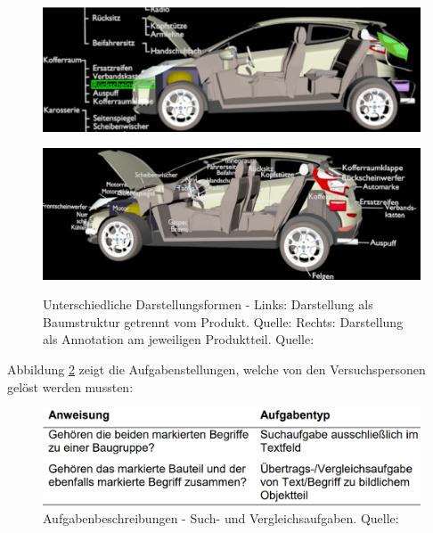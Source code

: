 \begin{figure}[H]
	\centering
	\begin{minipage}{.5\textwidth}
		\centering
		\includegraphics[width=.95\linewidth]{resources/analyse/baumstruktur.png}
		\label{fig:baum}
	\end{minipage}%
	\begin{minipage}{.5\textwidth}
		\centering
		\includegraphics[width=.95\linewidth]{resources/analyse/annotation.png}
		\label{fig:annotation}
	\end{minipage}
\caption{Unterschiedliche Darstellungsformen - Links: Darstellung als Baumstruktur getrennt vom Produkt. Quelle: \cite[S.~127]{Brandenburg2019} Rechts: Darstellung als Annotation am jeweiligen Produktteil. Quelle: \cite[S.~128]{Brandenburg2019}}
\label{img:versuchAbbildung}
\end{figure}

Abbildung \ref{img:aufgabenbeschreibung} zeigt die Aufgabenstellungen, welche von den Versuchspersonen gelöst werden mussten:

\begin{figure}[H]
	\centering 
	\includegraphics[width=.6\textwidth]{resources/analyse/brandenburg_aufgabentypen.png}
	\caption{Aufgabenbeschreibungen - Such- und Vergleichsaufgaben. Quelle: \cite[S.~132]{Brandenburg2019}}
	\label{img:aufgabenbeschreibung}
\end{figure}

